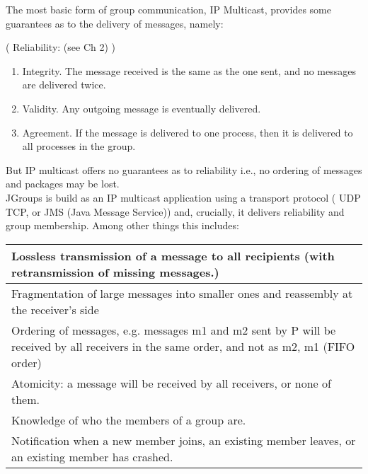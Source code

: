 The most basic form of group communication, IP Multicast, provides some guarantees as to the delivery of messages, namely:

( Reliability: (see Ch 2) )

\begin{enumerate}
\item Integrity. The message received is the same as the one sent, and no messages are delivered twice. 
\item Validity. Any outgoing  message is eventually delivered.
\item Agreement. If the message is delivered to one process, then it is delivered to all processes in the group.
\end{enumerate}

But IP multicast offers no guarantees as to reliability i.e., no ordering of messages and packages may be lost. \\

JGroups is build as an IP multicast application using a transport protocol ( UDP TCP, or JMS (Java Message Service)) 
and, crucially,  it delivers reliability and group membership. Among other things this includes:\\

 \label{tab:title}
\begin{tabular}{L{4.45in} }    %
\toprule[1.5pt] %

Lossless transmission of a message to all recipients (with retransmission of missing messages.) \\\midrule
Fragmentation of large messages into smaller ones and reassembly at the receiver's side\\\midrule
Ordering of messages, e.g. messages m1 and m2 sent by P will be received by all receivers in the same order, and not as m2, m1 (FIFO order)\\\midrule
Atomicity: a message will be received by all receivers, or none of them.\\\midrule
Knowledge of who the members of a group are. \\\midrule
Notification when a new member joins, an existing member leaves, or an existing member has crashed.\\

\bottomrule[1.25pt] %
\end {tabular}\par
\bigskip



